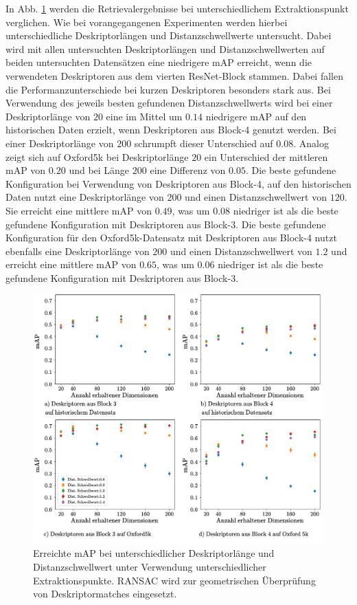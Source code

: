 In Abb. \ref{mAP_layer_diff_ransac} werden die Retrievalergebnisse bei unterschiedlichem Extraktionspunkt verglichen. Wie bei vorangegangenen Experimenten werden hierbei unterschiedliche Deskriptorlängen und Distanzschwellwerte untersucht. Dabei wird mit allen untersuchten Deskriptorlängen und Distanzschwellwerten auf beiden untersuchten Datensätzen eine niedrigere mAP erreicht, wenn die verwendeten Deskriptoren aus dem vierten ResNet-Block stammen. Dabei fallen die Performanzunterschiede bei kurzen Deskriptoren besonders stark aus. Bei Verwendung des jeweils besten gefundenen Distanzschwellwerts wird bei einer Deskriptorlänge von $20$ eine im Mittel um $0.14$ niedrigere mAP auf den historischen Daten erzielt, wenn Deskriptoren aus Block-4 genutzt werden. Bei einer Deskriptorlänge von $200$ schrumpft dieser Unterschied auf $0.08$. Analog zeigt sich auf Oxford5k bei Deskriptorlänge $20$ ein Unterschied der mittleren mAP von $0.20$ und bei Länge $200$ eine Differenz von $0.05$. Die beste gefundene Konfiguration bei Verwendung von Deskriptoren aus Block-4, auf den historischen Daten nutzt eine Deskriptorlänge von $200$ und einen Distanzschwellwert von $120$. Sie erreicht eine mittlere mAP von $0.49$, was um $0.08$ niedriger ist als die beste gefundene Konfiguration mit Deskriptoren aus Block-3. Die beste gefundene Konfiguration für den Oxford5k-Datensatz mit Deskriptoren aus Block-4 nutzt ebenfalls eine Deskriptorlänge von $200$ und einen Distanzschwellwert von $1.2$ und erreicht eine mittlere mAP von $0.65$, was um $0.06$ niedriger ist als die beste gefundene Konfiguration mit Deskriptoren aus Block-3.
\begin{figure}[h]
\includegraphics[scale=0.73]{mAP_layer_diff_ransac}
\caption{Erreichte mAP bei unterschiedlicher Deskriptorlänge und Distanzschwellwert unter Verwendung unterschiedlicher Extraktionspunkte.
RANSAC wird zur geometrischen Überprüfung von Deskriptormatches eingesetzt.}
\label{mAP_layer_diff_ransac}
\end{figure}
